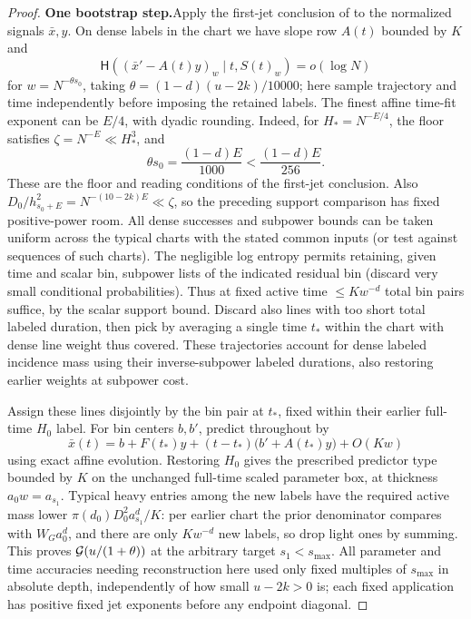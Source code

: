 \begin{proof}
\par\smallskip\noindent\textbf{One bootstrap step.}\quad  Apply the first-jet conclusion of  to the normalized signals \(\bar x,y\). On dense labels in the chart we have slope row \(A(t)\) bounded by \(K\) and
\[
 \mathsf H((\bar x'-A(t)y)_w\mid t,S(t)_w)=o(\log N)
\]
for \(w=N^{-\theta s_0}\), taking \(\theta=(1-d)(u-2k)/10000\); here sample trajectory and time independently before imposing the retained labels. The finest affine time-fit exponent can be \(E/4\), with dyadic
rounding.  Indeed, for \(H_*=N^{-E/4}\), the floor satisfies
\(\zeta=N^{-E}\ll H_*^3\), and
\[
 \theta s_0=\frac{(1-d)E}{1000}
       <\frac{(1-d)E}{256}.
\]
These are the floor and reading conditions of the first-jet
conclusion.  Also
\(D_0/h_{s_0+E}^2=N^{-(10-2k)E}\ll\zeta\), so the preceding
support comparison has fixed positive-power room. All dense successes and subpower bounds can be taken uniform across the typical charts with the stated common inputs (or test against sequences of such charts). The negligible log entropy permits retaining, given time and scalar bin, subpower lists of the indicated residual bin (discard very small conditional probabilities). Thus at fixed active time \(\le K w^{-d}\) total bin pairs suffice, by the scalar support bound. Discard also lines with too short total labeled duration, then pick by averaging a single time \(t_*\) within the chart with dense line weight thus covered. These trajectories account for dense labeled incidence mass using their inverse-subpower labeled durations, also restoring earlier weights at subpower cost.

Assign these lines disjointly by the bin pair at \(t_*\), fixed within their earlier full-time \(H_0\) label. For bin centers \(b,b'\), predict throughout by
\[
 \bar x(t)= b+F(t_*)y+(t-t_*)\big(b'+A(t_*)y\big)+O(Kw)
\]
using exact affine evolution. Restoring \(H_0\) gives the prescribed predictor type bounded by \(K\) on the unchanged full-time scaled parameter box, at thickness \(a_0 w=a_{s_1}\). Typical heavy entries among the new labels have the required active mass lower \(\pi(d_0)D_0^2 a_{s_1}^d/K\): per earlier chart the prior denominator compares with \(W_G a_0^d\), and there are only \(K w^{-d}\) new labels, so drop light ones by summing. This proves \({\cal G}(u/(1+\theta))\) at the arbitrary target \(s_1<s_{\max}\). All parameter and time accuracies needing reconstruction here used only fixed multiples of \(s_{\max}\) in absolute depth, independently of how small \(u-2k>0\) is; each fixed application has positive fixed jet exponents before any endpoint diagonal.


\end{proof}
